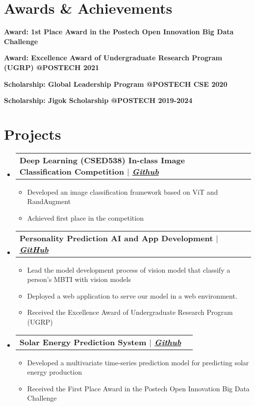 \documentclass[letterpaper,11pt]{article}
\makeatletter
\newcommand{\resumeItem}[1]{
  \item\small{
    {#1 \vspace{-2pt}}
  }
}
\newcommand{\resumeProjectHeading}[1]{
  \vspace{-2pt}\item
    \begin{tabular*}{0.97\textwidth}[t]{l@{\extracolsep{\fill}}r}
      \textbf{#1} \\
    \end{tabular*}\vspace{-7pt}
}
\newcommand{\resumeSubHeadingListStart}{\begin{itemize}[leftmargin=0.15in, label={}]}
\newcommand{\resumeSubHeadingListEnd}{\end{itemize}}
\newcommand{\resumeItemListStart}{\begin{itemize}}
\newcommand{\resumeItemListEnd}{\end{itemize}\vspace{-5pt}}
\makeatother
\begin{document}

\section{Awards \& Achievements}
\vspace{2pt}
\resumeSubHeadingListStart
\small{\item{
              \textbf{Award: 1st Place Award in the Postech Open Innovation Big Data Challenge} \\ \vspace{3pt}
        }}
\small{
  \item{
    \textbf{Award: Excellence Award of Undergraduate Research Program (UGRP) @POSTECH 2021}
  }
}
\small{\item{
  \textbf{Scholarship: Global Leadership Program @POSTECH CSE 2020} 
}}
\small{\item{
  \textbf{Scholarship: Jigok Scholarship @POSTECH 2019-2024}
}}
\resumeSubHeadingListEnd


\section{Projects}
\vspace{3pt}
\resumeSubHeadingListStart

\resumeProjectHeading
{\textbf{Deep Learning (CSED538) In-class Image Classification Competition} $|$ \emph{\href{https://github.com/happyhappy-jun/CSED538-final-project}{Github}}}
\resumeItemListStart
  \resumeItem{Developed an image classification framework based on ViT and RandAugment}
\resumeItem{Achieved first place in the competition}
\resumeItemListEnd

\resumeProjectHeading
{\textbf{Personality Prediction AI and App Development} $|$ \emph{\href{https://github.com/hhyy0401/UGRP}{GitHub}}}
\resumeItemListStart
\resumeItem{Lead the model development process of vision model that classify a person's MBTI with vision models}
\resumeItem{Deployed a web application to serve our model in a web environment.}
\resumeItem{Received the Excellence Award of Undergraduate Research Program (UGRP)}
\resumeItemListEnd

\resumeProjectHeading
{\textbf{Solar Energy Prediction System} $|$ \emph{\href{https://github.com/happyhappy-jun/2020-Postech-Open-innovation-Bigdata-Challenge}{Github}}}
\resumeItemListStart
\resumeItem{Developed a multivariate time-series prediction model for predicting solar energy production}
\resumeItem{Received the First Place Award in the Postech Open Innovation Big Data Challenge}
\resumeItemListEnd
\resumeSubHeadingListEnd
\end{document}
